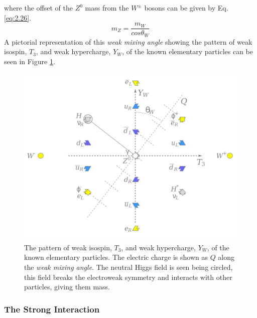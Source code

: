 %
where the offset of the $Z^{0}$ mass from the $W^{\pm}$ bosons can be given by Eq. \ref{eq:2.26}.
%
\begin{equation}\label{eq:2.26}
    m_{Z} = \frac{m_{W}}{cos\theta_{W}}
\tag{2.26}
\end{equation}
%
A pictorial representation of this \textit{weak mixing angle} showing the pattern of weak 
isospin, $T_{3}$, and weak hypercharge, $Y_{W}$, of the known elementary particles can be seen 
in Figure \ref{fig:wma}. 
%
\newpage
\begin{figure}[ht]
    \centering
    \includegraphics[scale=0.55]{figs/ch2/weak_mixing_angle}%
    \caption{ The pattern of weak isospin, $T_{3}$, and weak hypercharge, $Y_{W}$, of the known elementary particles.
    The electric charge is shown as $Q$ along the \textit{weak mixing angle}. The neutral Higgs field is seen being
    circled, this field breaks the electroweak symmetry and interacts with other particles, giving them mass. }
\label{fig:wma}
\end{figure}


\subsubsection{The Strong Interaction}

